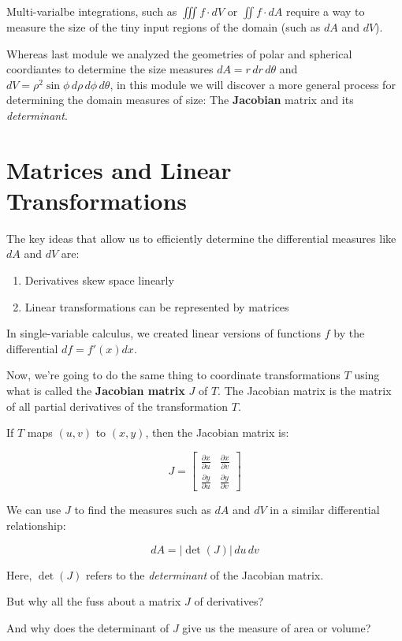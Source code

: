 \documentclass{ximera}
\begin{document}
Multi-varialbe integrations, such as $\iiint f\cdot dV$ or $\iint f\cdot dA$ require a way to measure the size of the tiny input regions of the domain (such as $dA$ and $dV$).

Whereas last module we analyzed the geometries of polar and spherical coordiantes to determine the size measures $dA=r\,dr\,d\theta$ and $dV = \rho^2\sin\phi\,d\rho\,d\phi\,d\theta$, in this module we will discover a more general process for determining the domain measures of size: The \textbf{Jacobian} matrix and its \emph{determinant}.

\section*{Matrices and Linear Transformations}

The key ideas that allow us to efficiently determine the differential measures like $dA$ and $dV$ are:

\begin{enumerate}
  \item Derivatives skew space linearly
  \item Linear transformations can be represented by matrices
\end{enumerate}

In single-variable calculus, we created linear versions of functions $f$ by the differential $df = f'(x)dx$. 

Now, we're going to do the same thing to coordinate transformations $T$ using what is called the \textbf{Jacobian matrix} $J$ of $T$. The Jacobian matrix is the matrix of all partial derivatives of the transformation $T$.

If $T$ maps $(u,v)$ to $(x,y)$, then the Jacobian matrix is:

$$J = \begin{bmatrix}\frac{\partial x}{\partial u} & \frac{\partial x}{\partial v} \\[6pt] \frac{\partial y}{\partial u} & \frac{\partial y}{\partial v}\end{bmatrix}$$

We can use $J$ to find the measures such as $dA$ and $dV$ in a similar differential relationship:

$$dA = |\det(J)|\,du\,dv$$

Here, $\det(J)$ refers to the \emph{determinant} of the Jacobian matrix.

But why all the fuss about a matrix $J$ of derivatives?

And why does the determinant of $J$ give us the measure of area or volume? 
\end{document}
